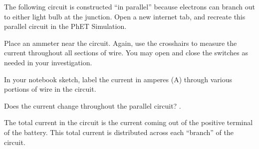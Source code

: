 \documentclass[]{exam}
\begin{document}
\begin{questions}

\question
The following circuit is constructed ``in parallel'' because electrons can branch out to either light bulb at the junction. Open a new internet tab, and recreate this parallel circuit in the PhET Simulation. 


\begin{center}
\end{center}
 
\question
Place an ammeter near the circuit. Again, use the crosshairs to measure the current throughout all sections of wire. You may open and close the switches as needed in your investigation.

In your notebook sketch, label the current in amperes (A) through various portions of wire in the circuit.


\question
Does the current change throughout the parallel circuit? \fillin[Yes].

\question
The total current in the circuit is the current coming out of the positive terminal of the battery. This total current is distributed across each ``branch'' of the circuit.


\end{questions}
\end{document}
